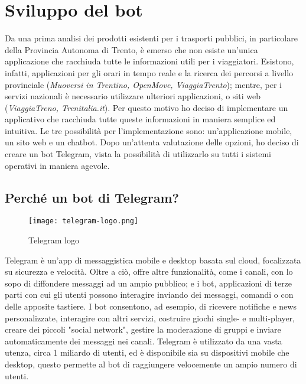 \chapter{Sviluppo del bot}
\label{cha:intro}
Da una prima analisi dei prodotti esistenti per i trasporti pubblici, in particolare della Provincia Autonoma di Trento, è emerso che non esiste un'unica applicazione che racchiuda tutte le informazioni utili per i viaggiatori. Esistono, infatti, applicazioni per gli orari in tempo reale e la ricerca dei percorsi a livello provinciale (\textit{Muoversi in Trentino, OpenMove, ViaggiaTrento}); mentre, per i servizi nazionali è necessario utilizzare ulteriori applicazioni, o siti web (\textit{ViaggiaTreno, Trenitalia.it}).
Per questo motivo ho deciso di implementare un applicativo che racchiuda tutte queste informazioni in maniera semplice ed intuitiva. 
Le tre possibilità per l'implementazione sono: un'applicazione mobile, un sito web e un chatbot. Dopo un'attenta valutazione delle opzioni, ho deciso di creare un bot Telegram, vista la possibilità di utilizzarlo su tutti i sistemi operativi in maniera agevole.  

\section{Perché un bot di Telegram?}

\begin{wrapfigure}{r}{0.33\textwidth}
\centering
\texttt{[image: telegram-logo.png]}
\caption{Telegram logo}
\label{fig:telegram_logo}
\end{wrapfigure}

Telegram è un'app di messaggistica mobile e desktop basata sul cloud, focalizzata su sicurezza e velocità. \cite{Telegram} Oltre a ciò, offre altre funzionalità, come i canali, con lo sopo di diffondere messaggi ad un ampio pubblico; e i bot, applicazioni di terze parti con cui gli utenti possono interagire inviando dei messaggi, comandi o con delle apposite tastiere. I bot consentono, ad esempio, di ricevere notifiche e news personalizzate, interagire con altri servizi, costruire giochi single- e multi-player, creare dei piccoli "social network", gestire la moderazione di gruppi e inviare automaticamente dei messaggi nei canali. 
Telegram è utilizzato da una vasta utenza, circa 1 miliardo di utenti, ed è disponibile sia su dispositivi mobile che desktop, questo permette al bot di raggiungere velocemente un ampio numero di utenti. 

